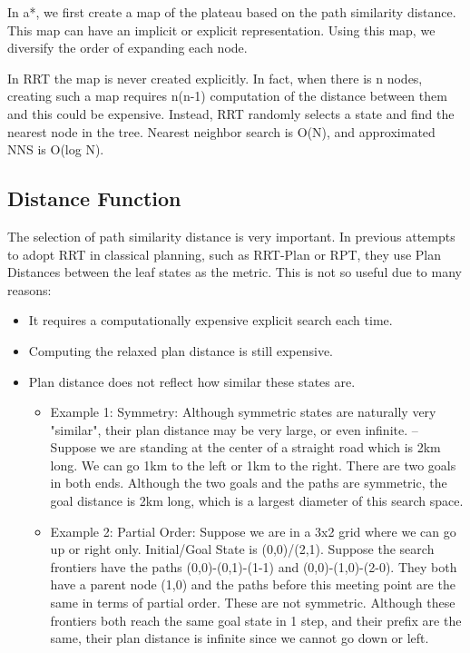 
In \*a*, we first create a map of the plateau based on the path similarity
distance. This map can have an implicit or explicit representation.
Using this map, we diversify the order of expanding each node.

In RRT the map is never created explicitly.
In fact, when there is n nodes, creating such a map requires n(n-1) computation of the distance
between them and this could be expensive. Instead, RRT randomly selects a state
and find the nearest node in the tree. Nearest neighbor search is O(N), and
approximated NNS is O(log N).

\subsection{Distance Function}
\label{sec-2-1}

The selection of path similarity distance is very important.
In previous attempts to adopt RRT in classical planning, such as
RRT-Plan or RPT, they use Plan Distances between the leaf states as the
metric. This is not so useful due to many reasons:

\begin{itemize}
\item It requires a computationally expensive explicit search each time.
\item Computing the relaxed plan distance is still expensive.
\item Plan distance does not reflect how similar these states are.
\begin{itemize}
\item Example 1: Symmetry: Although symmetric states are naturally very
"similar", their plan distance may be very large, or even
infinite. -- Suppose we are standing at the center of a straight
road which is 2km long. We can go 1km to the left or 1km to the
right. There are two goals in both ends. Although the two goals and the
paths are symmetric, the goal distance is 2km long, which is a largest
diameter of this search space.
\item Example 2: Partial Order: Suppose we are in a 3x2 grid where we can go
up or right only. Initial/Goal State is (0,0)/(2,1). Suppose the search
frontiers have the paths (0,0)-(0,1)-(1-1) and (0,0)-(1,0)-(2-0).
They both have a parent node
(1,0) and the paths before this meeting point are the same in terms of
partial order. These are not symmetric. Although these frontiers both reach
the same goal state in 1 step, and their prefix are the same, their
plan distance is infinite since we cannot go down or left.
\end{itemize}
\end{itemize}

